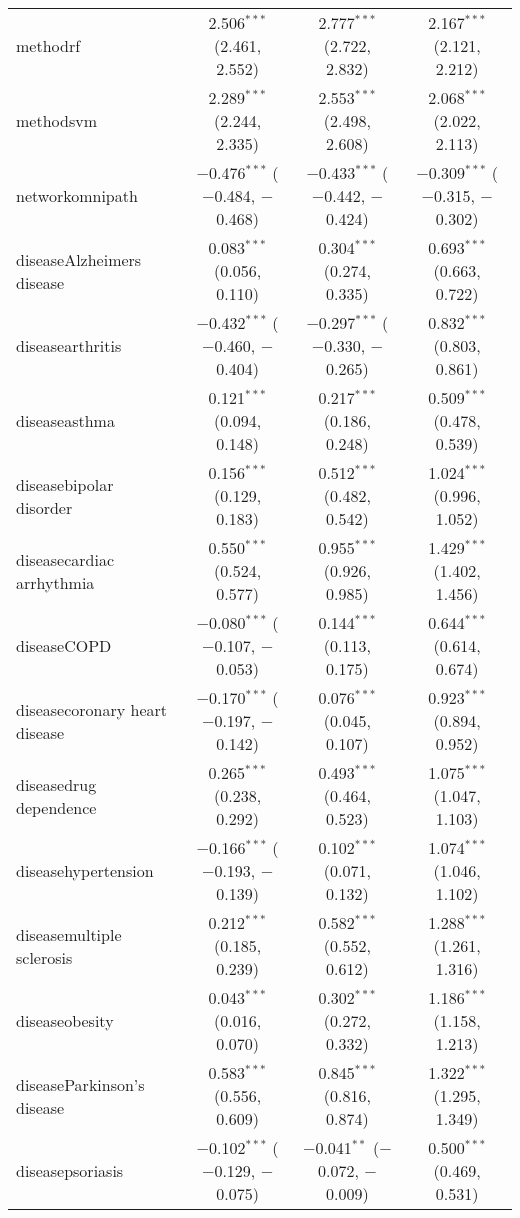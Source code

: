 \begin{table}[!htbp]
\begin{tabular}{@{\extracolsep{5pt}}lccc}
  methodrf & 2.506$^{***}$ (2.461, 2.552) & 2.777$^{***}$ (2.722, 2.832) & 2.167$^{***}$ (2.121, 2.212) \\ 
  methodsvm & 2.289$^{***}$ (2.244, 2.335) & 2.553$^{***}$ (2.498, 2.608) & 2.068$^{***}$ (2.022, 2.113) \\ 
  networkomnipath & $-$0.476$^{***}$ ($-$0.484, $-$0.468) & $-$0.433$^{***}$ ($-$0.442, $-$0.424) & $-$0.309$^{***}$ ($-$0.315, $-$0.302) \\ 
  diseaseAlzheimers disease & 0.083$^{***}$ (0.056, 0.110) & 0.304$^{***}$ (0.274, 0.335) & 0.693$^{***}$ (0.663, 0.722) \\ 
  diseasearthritis & $-$0.432$^{***}$ ($-$0.460, $-$0.404) & $-$0.297$^{***}$ ($-$0.330, $-$0.265) & 0.832$^{***}$ (0.803, 0.861) \\ 
  diseaseasthma & 0.121$^{***}$ (0.094, 0.148) & 0.217$^{***}$ (0.186, 0.248) & 0.509$^{***}$ (0.478, 0.539) \\ 
  diseasebipolar disorder & 0.156$^{***}$ (0.129, 0.183) & 0.512$^{***}$ (0.482, 0.542) & 1.024$^{***}$ (0.996, 1.052) \\ 
  diseasecardiac arrhythmia & 0.550$^{***}$ (0.524, 0.577) & 0.955$^{***}$ (0.926, 0.985) & 1.429$^{***}$ (1.402, 1.456) \\ 
  diseaseCOPD & $-$0.080$^{***}$ ($-$0.107, $-$0.053) & 0.144$^{***}$ (0.113, 0.175) & 0.644$^{***}$ (0.614, 0.674) \\ 
  diseasecoronary heart disease & $-$0.170$^{***}$ ($-$0.197, $-$0.142) & 0.076$^{***}$ (0.045, 0.107) & 0.923$^{***}$ (0.894, 0.952) \\ 
  diseasedrug dependence & 0.265$^{***}$ (0.238, 0.292) & 0.493$^{***}$ (0.464, 0.523) & 1.075$^{***}$ (1.047, 1.103) \\ 
  diseasehypertension & $-$0.166$^{***}$ ($-$0.193, $-$0.139) & 0.102$^{***}$ (0.071, 0.132) & 1.074$^{***}$ (1.046, 1.102) \\ 
  diseasemultiple sclerosis & 0.212$^{***}$ (0.185, 0.239) & 0.582$^{***}$ (0.552, 0.612) & 1.288$^{***}$ (1.261, 1.316) \\ 
  diseaseobesity & 0.043$^{***}$ (0.016, 0.070) & 0.302$^{***}$ (0.272, 0.332) & 1.186$^{***}$ (1.158, 1.213) \\ 
  diseaseParkinson's disease & 0.583$^{***}$ (0.556, 0.609) & 0.845$^{***}$ (0.816, 0.874) & 1.322$^{***}$ (1.295, 1.349) \\ 
  diseasepsoriasis & $-$0.102$^{***}$ ($-$0.129, $-$0.075) & $-$0.041$^{**}$ ($-$0.072, $-$0.009) & 0.500$^{***}$ (0.469, 0.531) \\ 

\end{tabular}
\end{table}
